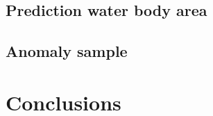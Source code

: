 \subsection{Prediction water body area}





\subsection{Anomaly sample}






\section{Conclusions}

